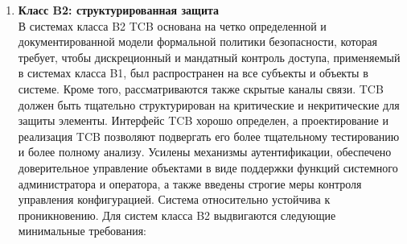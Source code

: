 \begin{enumerate}
\begin{enumerate}
\begin{enumerate}
\begin{enumerate}
\begin{itemize}
                    Защитные механизмы должны быть протестированы и проверены на работоспособность в соответствии с сопроводительной документацией на компьютерную систему.  Команда специалистов,
                    досконально разбирающихся в специфике реализации TCB, должна провести тщательный анализ и тестирование проектной документации, исходного и объектного кода системы. Целями такой
                    проверки должны быть: выявление недостатков проектирования и реализации, которые позволят субъекту, внешнему по отношению к TCB, совершать действия (чтение, изменение или удаление данных),
                    обычно отклоняемые мандатными и дискреционными политиками безопасности, применяемыми в TCB; а также проверка того, что ни один субъект не способен привести (без разрешения на это)
                    TCB в состояние, при котором он не сможет отвечать на запросы от других пользователей системы. Все обнаруженные недостатки должны быть устранены, а TCB повторно протестирован для
                    демонстрации отсутствия старых и новых недостатков.
                    \item{\textbf{Спецификация и верификация проекта системы}}\\
                    Неформальная или формальная модель политики безопасности, поддерживаемая TCB, должна поддерживаться на протяжении всего жизненного цикла системы и соответствовать своим аксиомам.
                \end{itemize}
            \end{enumerate}
        \end{enumerate}
		\item{\textbf{Класс B2: структурированная защита}}\\
		В системах класса B2 TCB основана на четко определенной и документированной модели формальной политики безопасности, которая требует, чтобы дискреционный и мандатный контроль доступа,
		применяемый в системах класса B1, был распространен на все субъекты и объекты в системе. Кроме того, рассматриваются также скрытые каналы связи. TCB должен быть тщательно структурирован
		на критические и некритические для защиты элементы.  Интерфейс TCB хорошо определен, а проектирование и реализация TCB позволяют подвергать его более тщательному тестированию и более
		полному анализу. Усилены механизмы аутентификации, обеспечено доверительное управление объектами в виде поддержки функций системного администратора и оператора, а также введены
		строгие меры контроля управления конфигурацией. Система относительно устойчива к проникновению. Для систем класса B2 выдвигаются следующие минимальные требования:

\end{enumerate}
\end{enumerate}
